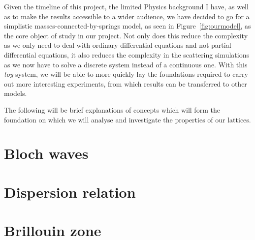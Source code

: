Given the timeline of this project, the limited Physics background I have, as
well as to make the results accessible to a wider audience, we have decided to
go for a simplistic masses-connected-by-springs model, as seen in
Figure~\ref{fig:ourmodel}, as the core object of study in our project. Not only
does this reduce the complexity as we only need to deal with ordinary
differential equations and not partial differential equations, it also reduces
the complexity in the scattering simulations as we now have to solve a discrete
system instead of a continuous one. With this \textit{toy} system, we will be
able to more quickly lay the foundations required to carry out more interesting
experiments, from which results can be transferred to other models.

The following will be brief explanations of concepts which will form the
foundation on which we will analyse and investigate the properties of our
lattices.

\section{Bloch waves}

\section{Dispersion relation}

\section{Brillouin zone}


